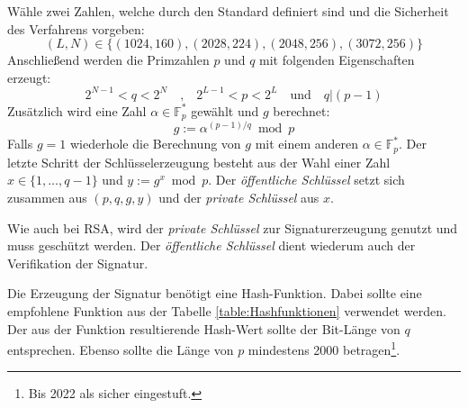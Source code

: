 \documentclass[11pt,a4paper,ngerman]{scrreprt}
\begin{document}
\begin{description}[font=\rmfamily]
    \item[Schlüsselerzeugung] Wähle zwei Zahlen, welche durch den Standard definiert sind und die Sicherheit des Verfahrens vorgeben:
    \[
        (L, N) \in \{(1024, 160), (2028, 224), (2048, 256), (3072, 256)\}
    \]
    Anschließend werden die Primzahlen $p$ und $q$ mit folgenden Eigenschaften erzeugt:
    \[
        2^{N-1} < q < 2^N \quad\textrm{,}\quad 2^{L-1} < p < 2^L \quad\textrm{und}\quad q|(p-1)
    \]
    Zusätzlich wird eine Zahl $\alpha \in \mathbb{F}^*_p$ gewählt und $g$ berechnet:
    \[
        g := \alpha^{(p-1)/q} \bmod p
    \]
    Falls $g = 1$ wiederhole die Berechnung von $g$ mit einem anderen $\alpha \in \mathbb{F}^*_p$. Der letzte Schritt der Schlüsselerzeugung besteht aus der Wahl einer Zahl $x \in \{1, \ldots, q - 1 \}$ und $y := g^x \bmod p$. Der \emph{öffentliche Schlüssel} setzt sich zusammen aus $(p, q, g, y)$ und der \emph{private Schlüssel} aus $x$.
    
    Wie auch bei RSA, wird der \emph{private Schlüssel} zur Signaturerzeugung genutzt und muss geschützt werden. Der \emph{öffentliche Schlüssel} dient wiederum auch der Verifikation der Signatur.
    \item[Signaturerzeugung] Die Erzeugung der Signatur benötigt eine Hash-Funktion. Dabei sollte eine empfohlene Funktion aus der Tabelle \ref{table:Hashfunktionen} verwendet werden. Der aus der Funktion resultierende Hash-Wert sollte der Bit-Länge von $q$ entsprechen. Ebenso sollte die Länge von $p$ mindestens 2000 betragen\footnote{Bis 2022 als sicher eingestuft.\cite{bsi-tr-02102-1}}.


\end{description}
\end{document}
